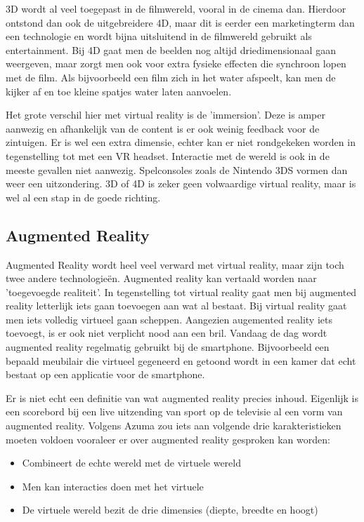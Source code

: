 3D wordt al veel toegepast in de filmwereld, vooral in de cinema dan. Hierdoor ontstond dan ook de uitgebreidere 4D, maar dit is eerder een marketingterm dan een technologie en wordt bijna uitsluitend in de filmwereld gebruikt als entertainment. Bij 4D gaat men de beelden nog altijd driedimensionaal gaan weergeven, maar zorgt men ook voor extra fysieke effecten die synchroon lopen met de film. Als bijvoorbeeld een film zich in het water afspeelt, kan men de kijker af en toe kleine spatjes water laten aanvoelen.

Het grote verschil hier met virtual reality is de 'immersion'. Deze is amper aanwezig en afhankelijk van de content is er ook weinig feedback voor de zintuigen. Er is wel een extra dimensie, echter kan er niet rondgekeken worden in tegenstelling tot met een VR headset. Interactie met de wereld is ook in de meeste gevallen niet aanwezig. Spelconsoles zoals de Nintendo 3DS vormen dan weer een uitzondering. 3D of 4D is zeker geen volwaardige virtual reality, maar is wel al een stap in de goede richting. \autocite{Peniche2016}

\subsection{Augmented Reality}
\label{subsec:augmented-reality}
Augmented Reality wordt heel veel verward met virtual reality, maar zijn toch twee andere technologieën. Augmented reality kan vertaald worden naar 'toegevoegde realiteit'. In tegenstelling tot virtual reality gaat men bij augmented reality letterlijk iets gaan toevoegen aan wat al bestaat. Bij virtual reality gaat men iets volledig virtueel gaan scheppen. Aangezien augemented reality iets toevoegt, is er ook niet verplicht nood aan een bril. Vandaag de dag wordt augmented reality regelmatig gebruikt bij de smartphone. Bijvoorbeeld een bepaald meubilair die virtueel gegeneerd en getoond wordt in een kamer dat echt bestaat op een applicatie voor de smartphone.

Er is niet echt een definitie van wat augmented reality precies inhoud. Eigenlijk is een scorebord bij een live uitzending van sport op de televisie al een vorm van augmented reality. Volgens Azuma \autocite{Azuma1997} zou iets aan volgende drie karakteristieken moeten voldoen vooraleer er over augmented reality gesproken kan worden:

\begin{itemize}
	\item Combineert de echte wereld met de virtuele wereld
	\item Men kan interacties doen met het virtuele
	\item De virtuele wereld bezit de drie dimensies (diepte, breedte en hoogt)
\end{itemize}

